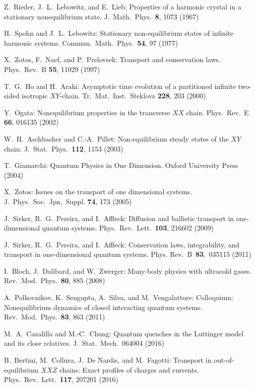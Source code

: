 \documentclass[12pt,a4paper]{article}
\theoremstyle{definition}
\theoremstyle{remark}
\begin{document}
\begin{thebibliography}{99}
 
 Z.\ Rieder, J.\ L.\ Lebowitz, and E.\ Lieb:
Properties of a harmonic crystal in a stationary nonequilibrium state.
J.\ Math.\ Phys.\ {\bf 8}, 1073 (1967)

 H.\ Spohn and J.\ L.\ Lebowitz:
Stationary non-equilibrium states of infinite harmonic systems.
Commun.\ Math.\ Phys.\ {\bf 54}, 97 (1977)

 X.\ Zotos, F.\ Naef, and P.\ Prelovsek:
Transport and conservation laws.
Phys.\ Rev.\ B {\bf55}, 11029 (1997)

 T.\ G.\ Ho and H.\ Araki:
Asymptotic time evolution of a partitioned infinite two-sided isotropic $XY$-chain.
Tr.\ Mat.\ Inst.\ Steklova {\bf 228}, 203 (2000)

 Y.\ Ogata:
Nonequilibrium properties in the transverse $XX$ chain.
Phys.\ Rev.\ E {\bf 66}, 016135 (2002) 

 W.\ H.\ Aschbacher and C.-A.\ Pillet:
Non-equilibrium steady states of the $XY$ chain.
J.\ Stat.\ Phys.\ {\bf 112}, 1153 (2003)

 T.\ Giamarchi:
Quantum Physics in One Dimension. 
Oxford University Press (2004)

 X.\ Zotos:
Issues on the transport of one dimensional systems. 
J.\ Phys.\ Soc.\ Jpn,\ Suppl. {\bf74}, 173 (2005) 

J.\ Sirker, R.\ G.\ Pereira, and I.\ Affleck:   
Diffusion and ballistic transport in one-dimensional
quantum systems. Phys.\ Rev.\ Lett.\ {\bf 103}, 216602 (2009)

 J.\ Sirker, R.\ G.\ Pereira, and I.\ Affleck:
Conservation laws, integrability, and transport in one-dimensional
quantum systems. Phys. Rev.\ B\ {\bf 83},\ 035115 (2011)
  
 I.\ Bloch, J.\ Dalibard, and W.\ Zwerger:
Many-body physics with ultracold gases.
Rev.\ Mod.\ Phys.\ {\bf 80}, 885 (2008)

 A.\ Polkovnikov, K.\ Sengupta, A.\ Silva, and M.\ Vengalattore:
Colloquium: Nonequilibrium dynamics of closed interacting quantum systems.
Rev.\ Mod.\ Phys.\ {\bf 83}, 863 (2011)

 M.\ A.\ Cazalilla and M.-C.\ Chung:
Quantum quenches in the Luttinger model and its close relatives.
J.\ Stat.\ Mech.\ 064004 (2016)

 B.\ Bertini, M.\ Collura, J.\ De Nardis, and M.\ Fagotti: 
Transport in out-of-equilibrium $XXZ$ chains: Exact profiles of charges
and currents. Phys.\ Rev.\ Lett.\ {\bf 117}, 207201 (2016)


\end{thebibliography}
\end{document}
